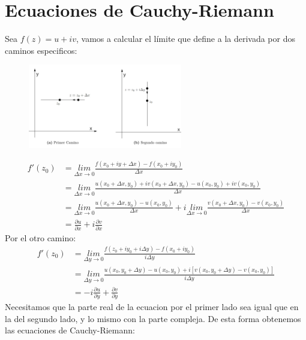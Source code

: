 \documentclass{article}
\begin{document}
\section{Ecuaciones de Cauchy-Riemann }
Sea $ f(z) = u + i v  $, vamos a calcular el límite que define a la derivada por dos caminos especificos:
\begin{figure}[H]
  \begin{center}
    \includegraphics[width=0.6\textwidth]{cauchy-riemann.png}
  \end{center}
\end{figure}
\begin{align*}
  f'(z_0) &= \underset{\Delta x  \rightarrow 0 }{lim}\frac{f(x_0 + i y + \Delta x ) - f(x_0 + i y_0 )}{\Delta x }\\ 
          &= \underset{\Delta x  \rightarrow 0 }{lim}\frac{u(x_0 + \Delta x, y_0 ) + i v(x_0 + \Delta x , y_0 ) - u (x_0 , y_0 ) + i v (x_0,y_0 )}{\Delta x }\\
          &= \underset{\Delta x  \rightarrow 0 }{lim}\frac{u (x_0 + \Delta x , y_0 ) - u (x_0, y_0 )}{\Delta x } + i \underset{\Delta x  \rightarrow 0 }{lim}\frac{v(x_0 + \Delta x , y_0 ) - v (x_0,y_0 )}{\Delta x }\\
          &= \frac{\partial u  }{\partial x } + i \frac{\partial v  }{\partial x }
\end{align*}
Por el otro camino: 
\begin{align*}
  f'(z_0) &= \underset{\Delta y  \rightarrow 0 }{lim}\frac{f(z_0 + i y _0 + i \Delta y ) - f(x_0 + i y_0 )}{i \Delta y }\\
          &= \underset{\Delta y  \rightarrow 0 }{lim}\frac{u (x_0, y_0 + \Delta y ) - u (x_0,y_0 ) + i[v(x_0,y_0 + \Delta y ) - v (x_0,y_0 )]}{i \Delta y }\\
          &= -i \frac{\partial u  }{\partial y } + \frac{\partial v  }{\partial y }
\end{align*}
Necesitamos que la parte real de la ecuacion por el primer lado sea igual que en la del segundo lado, y lo mismo con la parte compleja. De esta forma obtenemos las ecuaciones de Cauchy-Riemann: 
\end{document}
